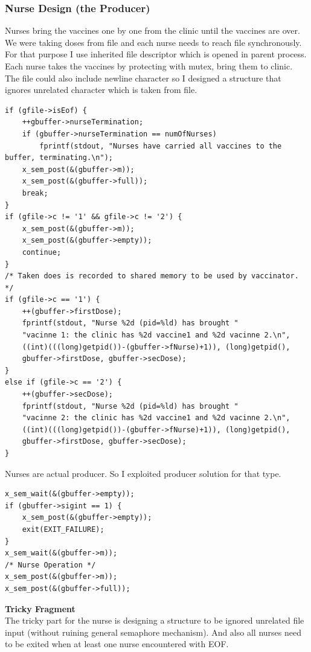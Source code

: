 \documentclass{article}
\begin{document}
\subsubsection{Nurse Design (the Producer)}
Nurses bring the vaccines one by one from the clinic until the vaccines are over. We were taking doses from file and each nurse needs to reach file synchronously. For that purpose I use inherited file descriptor which is opened in parent process. Each nurse takes the vaccines by protecting with mutex, bring them to clinic. The file could also include newline character so I designed a structure that ignores unrelated character which is taken from file.
\begin{lstlisting}[style=CStyle]
if (gfile->isEof) {
    ++gbuffer->nurseTermination;
    if (gbuffer->nurseTermination == numOfNurses)
        fprintf(stdout, "Nurses have carried all vaccines to the buffer, terminating.\n");
    x_sem_post(&(gbuffer->m));
    x_sem_post(&(gbuffer->full));
    break;
}
if (gfile->c != '1' && gfile->c != '2') {
    x_sem_post(&(gbuffer->m));
    x_sem_post(&(gbuffer->empty));
    continue;
}
/* Taken does is recorded to shared memory to be used by vaccinator. */
if (gfile->c == '1') {
    ++(gbuffer->firstDose);
    fprintf(stdout, "Nurse %2d (pid=%ld) has brought "
    "vacinne 1: the clinic has %2d vaccine1 and %2d vacinne 2.\n",
    ((int)(((long)getpid())-(gbuffer->fNurse)+1)), (long)getpid(),
    gbuffer->firstDose, gbuffer->secDose);
}
else if (gfile->c == '2') {
    ++(gbuffer->secDose);
    fprintf(stdout, "Nurse %2d (pid=%ld) has brought "
    "vacinne 2: the clinic has %2d vaccine1 and %2d vacinne 2.\n",
    ((int)(((long)getpid())-(gbuffer->fNurse)+1)), (long)getpid(),
    gbuffer->firstDose, gbuffer->secDose);
}
\end{lstlisting}
Nurses are actual producer. So I exploited producer solution for that type.
\begin{lstlisting}[style=CStyle]
x_sem_wait(&(gbuffer->empty));
if (gbuffer->sigint == 1) {
    x_sem_post(&(gbuffer->empty));
    exit(EXIT_FAILURE);
}
x_sem_wait(&(gbuffer->m));
/* Nurse Operation */
x_sem_post(&(gbuffer->m));
x_sem_post(&(gbuffer->full));
\end{lstlisting}
\textbf{Tricky Fragment}\\
The tricky part for the nurse is designing a structure to be ignored unrelated file input (without ruining general semaphore mechanism). And also all nurses need to be exited when at least one nurse encountered with EOF.
\end{document}
